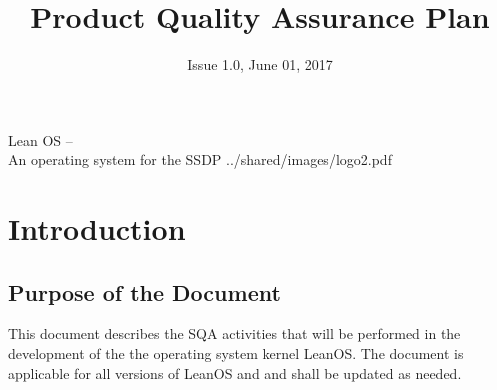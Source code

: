 

\title{Product Quality Assurance Plan}
\def \documentid {LEANOS-UVIE-PAQ-001}
\date{Issue 1.0, June 01, 2017}

\newcommand\affil[1]{\textsuperscript#1}

\def\preparedby {Armin Luntzer\affil{1}}
\def\checkedby {Roland Ottensamer\affil{1}, Christian Reimers\affil{1}}
\def\approvedby {Franz Kerschbaum\affil{1}}

\def\affiliations{
	\affil{1} Department of Astrophysics, University of Vienna
}








 
\usepackage{multicol}
\usepackage{enumitem}
\usepackage{vhistory}

\usepackage{biblatex}








\setmainfont{MyriadPro-SemiCondensed}
\uvietitlepage%
{Lean OS --\\ An operating system for the SSDP}%
{\doctitle}%
{../shared/images/logo2.pdf}
\setmainfont{MyriadPro}

\approvalpage

\tableofcontents
\newpage



\begin{versionhistory}
\end{versionhistory}


\chapter{Introduction}

\section{Purpose of the Document}


This document describes the \gls{SQA} activities that will be
performed in the development of the the operating system kernel LeanOS.
The document is applicable for all versions of LeanOS and and shall be updated
as needed.\\

